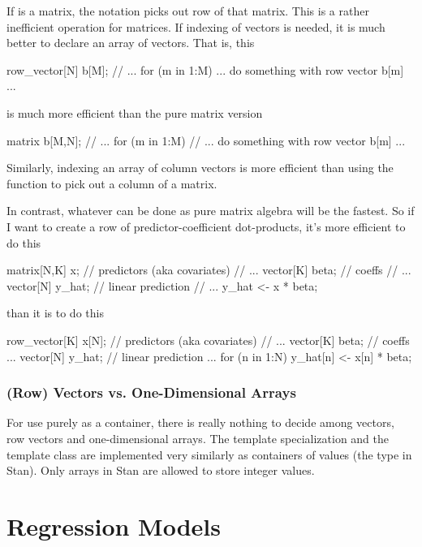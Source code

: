 If  is a matrix, the notation  picks out row
 of that matrix.  This is a rather inefficient operation for
matrices.  If indexing of vectors is needed, it is much better to
declare an array of vectors.  That is, this
%
\begin{stancode}
row_vector[N] b[M];
// ...
for (m in 1:M)
   ... do something with row vector b[m] ...
\end{stancode}
%
is much more efficient than the pure matrix version
%
\begin{stancode}
matrix b[M,N];
// ...
for (m in 1:M)
   // ... do something with row vector b[m] ...
\end{stancode}
%
Similarly, indexing an array of column vectors is more efficient than
using the  function to pick out a column of a matrix.

In contrast, whatever can be done as pure matrix algebra will be the
fastest.  So if I want to create a row of predictor-coefficient
dot-products, it's more efficient to do this
%
\begin{stancode}
matrix[N,K] x;    // predictors (aka covariates)
// ...
vector[K] beta;   // coeffs
// ...
vector[N] y_hat;  // linear prediction
// ...
y_hat <- x * beta;
\end{stancode}
%
than it is to do this
%
\begin{stancode}
row_vector[K] x[N];    // predictors (aka covariates)
// ...
vector[K] beta;   // coeffs
...
vector[N] y_hat;  // linear prediction
...
for (n in 1:N)
  y_hat[n] <- x[n] * beta;
\end{stancode}

\subsection{(Row) Vectors vs. One-Dimensional Arrays}

For use purely as a container, there is really nothing to decide among
vectors, row vectors and one-dimensional arrays.  The
 template specialization and the
 template class are implemented very similarly as
containers of  values (the type  in Stan).
Only arrays in Stan are allowed to store integer values.



\chapter{Regression Models}

